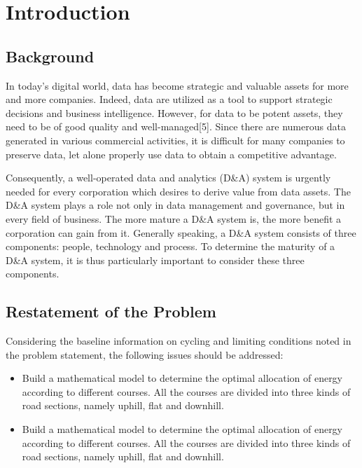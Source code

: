 \documentclass{mcmthesis}  %
\begin{document}
	\maketitle  %
	
	\tableofcontents  %
	
	
	\newpage  %
	\section{Introduction}  %
	\subsection{Background}  %
	In today’s digital world, data has become strategic and valuable assets for more and more companies. Indeed, data are utilized as a tool to support strategic decisions and business intelligence. However, for data to be potent assets, they need to be of good quality and well-managed[5]. Since there are numerous data generated in various commercial activities, it is difficult for many companies to preserve data, let alone properly use data to obtain a competitive advantage. 
	
	Consequently, a well-operated data and analytics (D\&A) system is urgently needed for every corporation which desires to derive value from data assets. The D\&A system plays a role not only in data management and governance, but in every field of business. The more mature a D\&A system is, the more benefit a corporation can gain from it. Generally speaking, a D\&A system consists of three components: people, technology and process. To determine the maturity of a D\&A system, it is thus particularly important to consider these three components.
	
	\subsection{Restatement of the Problem}
	Considering the baseline information on cycling and limiting conditions noted in the problem statement, the following issues should be addressed:
	\begin{itemize}
		\item Build a mathematical model to determine the optimal allocation of energy according to different courses. All the courses are divided into three kinds of road sections, namely uphill, flat and downhill.
		\item Build a mathematical model to determine the optimal allocation of energy according to different courses. All the courses are divided into three kinds of road sections, namely uphill, flat and downhill.
	\end{itemize}
	
\end{document}
